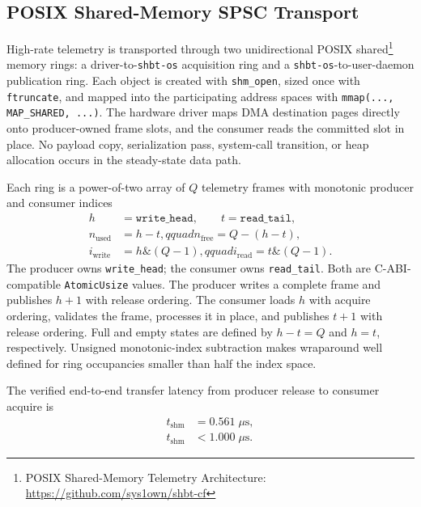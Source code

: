\documentclass[10pt,twocolumn]{IEEEtran}
\newcommand{\shbtos}{\texttt{shbt-os}}
\begin{document}
\subsection{POSIX Shared-Memory SPSC Transport}
\label{sec:zero_copy_telemetry}

High-rate telemetry is transported through two unidirectional POSIX shared\footnote{POSIX Shared-Memory Telemetry Architecture: \url{https://github.com/sys1own/shbt-cf}}
memory rings: a driver-to-\shbtos{} acquisition ring and a
\shbtos{}-to-user-daemon publication ring.  Each object is created with
\texttt{shm\_open}, sized once with \texttt{ftruncate}, and mapped into the
participating address spaces with \texttt{mmap(..., MAP\_SHARED, ...)}.  The
hardware driver maps DMA destination pages directly onto producer-owned frame
slots, and the consumer reads the committed slot in place.  No payload copy,
serialization pass, system-call transition, or heap allocation occurs in the
steady-state data path.

Each ring is a power-of-two array of $Q$ telemetry frames with monotonic
producer and consumer indices
\begin{equation}
\begin{aligned}
h&=\texttt{write\_head},\qquad
t=\texttt{read\_tail}, \\
n_{\mathrm{used}}&=h-t,qquad
n_{\mathrm{free}}=Q-(h-t), \\
i_{\mathrm{write}}&=h\mathbin{\&}(Q-1),qquad
i_{\mathrm{read}}=t\mathbin{\&}(Q-1).
\end{aligned}
\label{eq:spsc_ring_indices}
\end{equation}
The producer owns \texttt{write\_head}; the consumer owns
\texttt{read\_tail}.  Both are C-ABI-compatible \texttt{AtomicUsize} values.
The producer writes a complete frame and publishes $h+1$ with release ordering.
The consumer loads $h$ with acquire ordering, validates the frame, processes it
in place, and publishes $t+1$ with release ordering.  Full and empty states are
defined by $h-t=Q$ and $h=t$, respectively.  Unsigned monotonic-index
subtraction makes wraparound well defined for ring occupancies smaller than
half the index space.

The verified end-to-end transfer latency from producer release to consumer
acquire is
\begin{equation}
\begin{aligned}
t_{\mathrm{shm}}&=0.561\;\mu\mathrm{s}, \\
t_{\mathrm{shm}}&<1.000\;\mu\mathrm{s}.
\end{aligned}
\label{eq:posix_shm_latency}
\end{equation}
\end{document}
